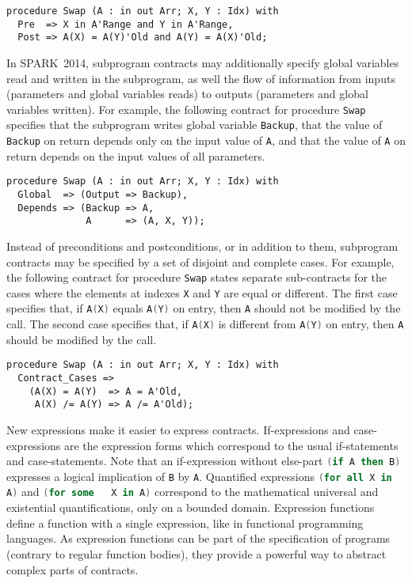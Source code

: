 \documentclass[10pt,a4paper,twocolumn]{article}
\newcommand{\newspark}{SPARK~2014\xspace}
\newcommand{\SPARK}[1]{\lstinline[language=Ada,basicstyle={\footnotesize
      \sffamily},framesep=0pt]$#1$}
\begin{document}
\begin{lstlisting}
procedure Swap (A : in out Arr; X, Y : Idx) with
  Pre  => X in A'Range and Y in A'Range,
  Post => A(X) = A(Y)'Old and A(Y) = A(X)'Old;
\end{lstlisting}

In \newspark, subprogram contracts may additionally specify global variables
read and written in the subprogram, as well the flow of information from inputs
(parameters and global variables reads) to outputs (parameters and global
variables written). For example, the following contract for procedure
\SPARK{Swap} specifies that the subprogram writes global variable
\SPARK{Backup}, that the value of \SPARK{Backup} on return depends only on the
input value of \SPARK{A}, and that the value of \SPARK{A} on return depends on
the input values of all parameters.

\begin{lstlisting}
procedure Swap (A : in out Arr; X, Y : Idx) with
  Global  => (Output => Backup),
  Depends => (Backup => A,
              A      => (A, X, Y));
\end{lstlisting}

Instead of preconditions and postconditions, or in addition to them, subprogram
contracts may be specified by a set of disjoint and complete cases. For
example, the following contract for procedure \SPARK{Swap} states separate
sub-contracts for the cases where the elements at indexes \SPARK{X} and
\SPARK{Y} are equal or different. The first case specifies that, if
\SPARK{A(X)} equals \SPARK{A(Y)} on entry, then \SPARK{A} should not be
modified by the call. The second case specifies that, if \SPARK{A(X)} is
different from \SPARK{A(Y)} on entry, then \SPARK{A} should be modified by the
call.

\begin{lstlisting}
procedure Swap (A : in out Arr; X, Y : Idx) with
  Contract_Cases =>
    (A(X) = A(Y)  => A = A'Old,
     A(X) /= A(Y) => A /= A'Old);
\end{lstlisting}

New expressions make it easier to express contracts. If-expressions and
case-expressions are the expression forms which correspond to the usual
if-statements and case-statements. Note that an if-expression without else-part
\SPARK{(if A then B)} expresses a logical implication of \SPARK{B} by
\SPARK{A}. Quantified expressions \SPARK{(for all X in A)} and \SPARK{(for some
  X in A)} correspond to the mathematical universal and existential
quantifications, only on a bounded domain. Expression functions define a
function with a single expression, like in functional programming languages. As
expression functions can be part of the specification of programs (contrary to
regular function bodies), they provide a powerful way to abstract complex parts
of contracts.
\end{document}
